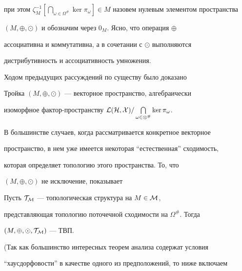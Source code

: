 при этом $\zeta^{-1}_M[\bigcap\limits_{\omega\in\Omega^{\#}} 


\ker\pi_\omega]\in M$ назовем нулевым элементом пространства 


$(M,\oplus,\odot)$ и обозначим через $0_M$. Ясно, что операция $\oplus$ 


ассоциативна и коммутативна, а в сочетании с $\odot$ выполняются 


дистрибутивность и ассоциативность умножения. 


 


Ходом предыдущих рассуждений по существу было доказано 


 


\begin{assrt} 


Тройка $(M,\oplus,\odot)$ --- векторное пространство, алгебраически 


изоморфное фактор-пространству $\cal 


L(H,X)/\bigcap\limits_{\omega\in\Omega^{\#}}\ker\pi_\omega$. 


\end{assrt} 


 


В большинстве случаев, когда рассматривается конкретное векторное 


пространство, в нем уже имеется некоторая ``естественная'' сходимость, 


которая определяет топологию этого пространства. То, что 


$(M,\oplus,\odot)$ не исключение, показывает 





\begin{thm} 


Пусть $\cal T_M$ --- топологическая структура на $M\in\cal M$, 


представляющая топологию поточечной сходимости на $\Omega^{\#}$. Тогда 


$(M,\oplus,\odot,\cal T_M)$ --- ТВП. 


\end{thm} 


 


(Так как большинство интересных теорем анализа содержат условия 


``хаусдорфовости'' в качестве одного из предположений, то ниже включаем 


